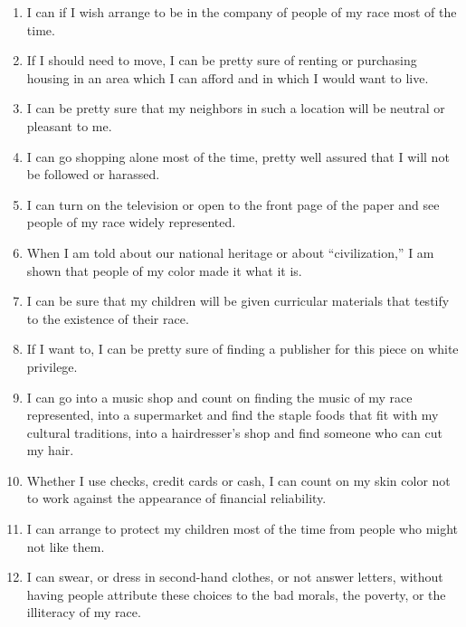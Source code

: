 \documentclass{article}
\begin{document}
\begin{enumerate}
	\item I can if I wish arrange to be in the company of people of my race
		most of the time.

	\item If I should need to move, I can be pretty sure of renting or
		purchasing housing in an area which I can afford and in which I would
		want to live.

	\item I can be pretty sure that my neighbors in such a location will be
		neutral or pleasant to me.

	\item I can go shopping alone most of the time, pretty well assured that I
		will not be followed or harassed.

	\item I can turn on the television or open to the front page of the paper
		and see people of my race widely represented.

	\item When I am told about our national heritage or about ``civilization,''
		I am shown that people of my color made it what it is.

	\item I can be sure that my children will be given curricular materials
		that testify to the existence of their race.

	\item If I want to, I can be pretty sure of finding a publisher for this
		piece on white privilege.

	\item I can go into a music shop and count on finding the music of my race
		represented, into a supermarket and find the staple foods that fit with
		my cultural traditions, into a hairdresser's shop and find someone who
		can cut my hair.

	\item Whether I use checks, credit cards or cash, I can count on my skin
		color not to work against the appearance of financial reliability.

	\item I can arrange to protect my children most of the time from people who
		might not like them.

	\item I can swear, or dress in second-hand clothes, or not answer letters,
		without having people attribute these choices to the bad morals, the
		poverty, or the illiteracy of my race.


\end{enumerate}
\end{document}
